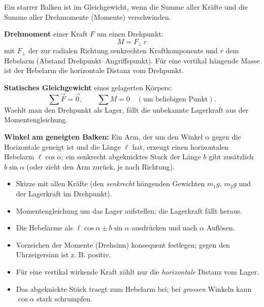 

Ein starrer Balken ist im Gleichgewicht, wenn die Summe aller Kräfte und
die Summe aller Drehmomente (Momente) verschwinden.

\begin{werkzeugkasten}[Werkzeuge]
\textbf{Drehmoment} einer Kraft $F$ um einen Drehpunkt:
\begin{equation}
  M=F_\perp\,r
\end{equation}
mit $F_\perp$ der zur radialen Richtung senkrechten Kraftkomponente und
$r$ dem Hebelarm (Abstand Drehpunkt--Angriffspunkt). Für eine
vertikal hängende Masse ist der Hebelarm die horizontale Distanz vom
Drehpunkt.

\textbf{Statisches Gleichgewicht} eines gelagerten Körpers:
\begin{equation}
  \sum \vec F=\vec 0,\qquad \sum M=0\quad(\text{um beliebigen Punkt}).
\end{equation}
Waehlt man den Drehpunkt als Lager, fällt die unbekannte Lagerkraft aus
der Momentengleichung.

\textbf{Winkel am geneigten Balken:} Ein Arm, der um den Winkel $\alpha$
gegen die Horizontale geneigt ist und die Länge $\ell$ hat, erzeugt
einen horizontalen Hebelarm $\ell\cos\alpha$; ein senkrecht abgeknicktes
Stuck der Länge $b$ gibt zusätzlich $b\sin\alpha$ (oder zieht den Arm
zurück, je nach Richtung).
\end{werkzeugkasten}

\begin{werkzeugkasten}[Vorgehen]
\begin{itemize}
  \item Skizze mit allen Kräfte (den \emph{senkrecht} hängenden
        Gewichten $m_1g$, $m_2g$ und der Lagerkraft im Drehpunkt).
  \item Momentengleichung um das Lager aufstellen; die Lagerkraft fällt
        heraus.
  \item Die Hebelarme als $\ell\cos\alpha \pm b\sin\alpha$ ausdrücken und
        nach $\alpha$ Auflösen.
\end{itemize}
\end{werkzeugkasten}

\begin{achtung}
\begin{itemize}
  \item Vorzeichen der Momente (Drehsinn) konsequent festlegen; gegen den
        Uhrzeigersinn ist z. B. positiv.
  \item Für eine vertikal wirkende Kraft zählt nur die \emph{horizontale}
        Distanz vom Lager.
  \item Das abgeknickte Stück traegt zum Hebelarm bei; bei \emph{grossen}
        Winkeln kann $\cos\alpha$ stark schrumpfen.
\end{itemize}
\end{achtung}

